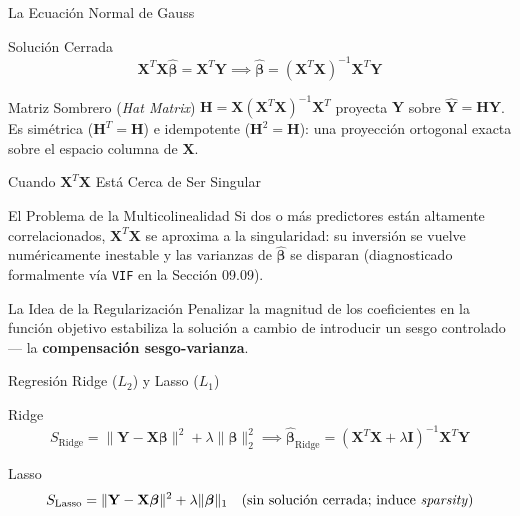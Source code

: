 \documentclass[10pt, aspectratio=169]{beamer}
\begin{document}
\begin{frame}{La Ecuación Normal de Gauss}
  \footnotesize
  \begin{block}{Solución Cerrada}
    $$\mathbf{X}^T\mathbf{X}\hat{\boldsymbol\beta}=\mathbf{X}^T\mathbf{Y} \implies \hat{\boldsymbol\beta}=(\mathbf{X}^T\mathbf{X})^{-1}\mathbf{X}^T\mathbf{Y}$$
  \end{block}
  \pause

  \vspace{0.1cm}
  \begin{alertblock}{Matriz Sombrero (\emph{Hat Matrix})}
    $\mathbf{H}=\mathbf{X}(\mathbf{X}^T\mathbf{X})^{-1}\mathbf{X}^T$ proyecta $\mathbf{Y}$ sobre $\hat{\mathbf{Y}}=\mathbf{H}\mathbf{Y}$. Es simétrica ($\mathbf{H}^T=\mathbf{H}$) e idempotente ($\mathbf{H}^2=\mathbf{H}$): una proyección ortogonal exacta sobre el espacio columna de $\mathbf{X}$.
  \end{alertblock}
\end{frame}

\begin{frame}{Cuando $\mathbf{X}^T\mathbf{X}$ Está Cerca de Ser Singular}
  \footnotesize
  \begin{block}{El Problema de la Multicolinealidad}
    Si dos o más predictores están altamente correlacionados, $\mathbf{X}^T\mathbf{X}$ se aproxima a la singularidad: su inversión se vuelve numéricamente inestable y las varianzas de $\hat{\boldsymbol\beta}$ se disparan (diagnosticado formalmente vía \texttt{VIF} en la Sección 09.09).
  \end{block}
  \pause

  \vspace{0.1cm}
  \begin{alertblock}{La Idea de la Regularización}
    Penalizar la magnitud de los coeficientes en la función objetivo estabiliza la solución a cambio de introducir un sesgo controlado --- la \textbf{compensación sesgo-varianza}.
  \end{alertblock}
\end{frame}

\begin{frame}{Regresión Ridge ($L_2$) y Lasso ($L_1$)}
  \footnotesize
  \begin{block}{Ridge}
    $$S_{\text{Ridge}}=\|\mathbf{Y}-\mathbf{X}\boldsymbol\beta\|^2+\lambda\|\boldsymbol\beta\|_2^2 \implies \hat{\boldsymbol\beta}_{\text{Ridge}}=(\mathbf{X}^T\mathbf{X}+\lambda\mathbf{I})^{-1}\mathbf{X}^T\mathbf{Y}$$
  \end{block}
  \pause

  \vspace{0.1cm}
  \begin{alertblock}{Lasso}
    $$S_{\text{Lasso}}=\|\mathbf{Y}-\mathbf{X}\boldsymbol\beta\|^2+\lambda\|\boldsymbol\beta\|_1 \quad \text{(sin solución cerrada; induce \emph{sparsity})}$$
  \end{alertblock}
\end{frame}
\end{document}
